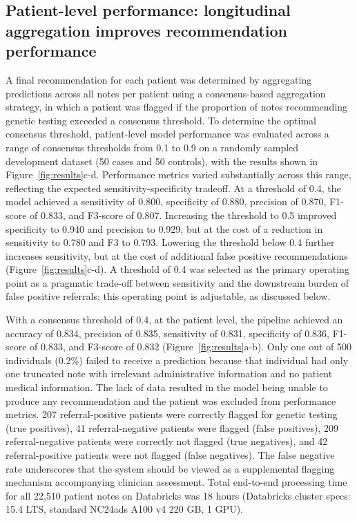 \documentclass[fleqn,10pt]{wlscirep}
\begin{document}
\subsection*{Patient-level performance: longitudinal aggregation improves recommendation performance}
A final recommendation for each patient was determined by aggregating predictions across all notes per patient using a consensus-based aggregation strategy, in which a patient was flagged if the proportion of notes recommending genetic testing exceeded a consensus threshold. To determine the optimal consensus threshold, patient-level model performance was evaluated across a range of consensus thresholds from 0.1 to 0.9 on a randomly sampled development dataset (50 cases and 50 controls), with the results shown in Figure~\ref{fig:results}c-d. Performance metrics varied substantially across this range, reflecting the expected sensitivity-specificity tradeoff. At a threshold of 0.4, the model achieved a sensitivity of 0.800, specificity of 0.880, precision of 0.870, F1-score of 0.833, and F3-score of 0.807. Increasing the threshold to 0.5 improved specificity to 0.940 and precision to 0.929, but at the cost of a reduction in sensitivity to 0.780 and F3 to 0.793. Lowering the threshold below 0.4 further increases sensitivity, but at the cost of additional false positive recommendations (Figure~\ref{fig:results}c-d). A threshold of 0.4 was selected as the primary operating point as a pragmatic trade-off between sensitivity and the downstream burden of false positive referrals; this operating point is adjustable, as discussed below.

With a consensus threshold of 0.4, at the patient level, the pipeline achieved an accuracy of 0.834, precision of 0.835, sensitivity of 0.831, specificity of 0.836, F1-score of 0.833, and F3-score of 0.832 (Figure~\ref{fig:results}a-b). Only one out of 500 individuals (0.2\%) failed to receive a prediction because that individual had only one truncated note with irrelevant administrative information and no patient medical information. The lack of data resulted in the model being unable to produce any recommendation and the patient was excluded from performance metrics. 207 referral-positive patients were correctly flagged for genetic testing (true positives), 41 referral-negative patients were flagged (false positives), 209 referral-negative patients were correctly not flagged (true negatives), and 42 referral-positive patients were not flagged (false negatives). The false negative rate underscores that the system should be viewed as a supplemental flagging mechanism accompanying clinician assessment. Total end-to-end processing time for all 22,510 patient notes on Databricks was 18 hours (Databricks cluster specs: 15.4 LTS, standard NC24ads A100 v4 220 GB, 1 GPU). 
\end{document}
